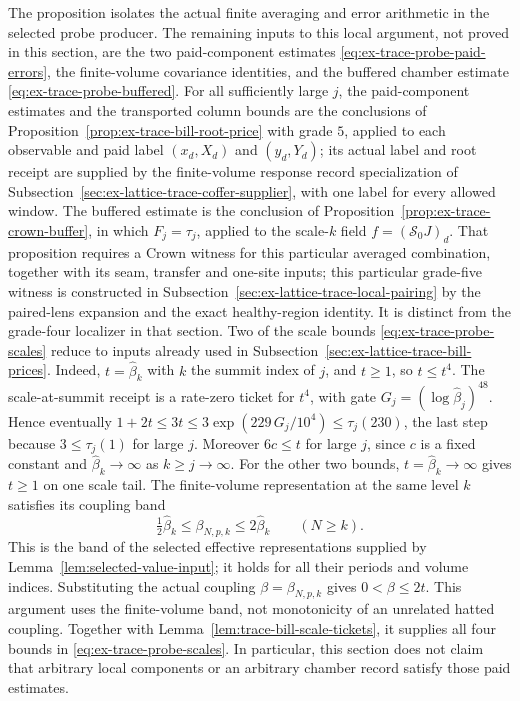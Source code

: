The proposition isolates the actual finite averaging and error arithmetic
in the selected probe producer. The remaining inputs to this
local argument, not proved in this section, are the two paid-component estimates
\eqref{eq:ex-trace-probe-paid-errors}, the finite-volume covariance
identities, and the buffered chamber estimate
\eqref{eq:ex-trace-probe-buffered}. For all sufficiently large $j$, the
paid-component estimates and the transported column bounds are the
conclusions of Proposition~\ref{prop:ex-trace-bill-root-price} with
grade $5$, applied to each observable and paid label $(x_d,X_d)$ and
$(y_d,Y_d)$; its actual label and root receipt are supplied by the finite-volume response record
specialization of Subsection~\ref{sec:ex-lattice-trace-coffer-supplier},
with one label for every allowed window. The buffered estimate is the conclusion of
Proposition~\ref{prop:ex-trace-crown-buffer}, in which $F_j=\tau_j$,
applied to the scale-$k$ field $f=(\mathscr S_0J)_d$. That proposition
requires a Crown witness for this particular averaged combination,
together with its seam, transfer and one-site inputs; this particular grade-five witness is constructed in
Subsection~\ref{sec:ex-lattice-trace-local-pairing} by the paired-lens
expansion and the exact healthy-region identity. It is distinct from
the grade-four localizer in that section. Two of the scale bounds \eqref{eq:ex-trace-probe-scales} reduce
to inputs already used in Subsection~\ref{sec:ex-lattice-trace-bill-prices}.
Indeed, $t=\widehat\beta_k$ with $k$ the summit index of $j$, and $t\ge1$,
so $t\le t^4$. The scale-at-summit receipt is a rate-zero ticket for
$t^4$, with gate $G_j=(\log\widehat\beta_j)^{48}$. Hence eventually
$1+2t\le3t\le3\exp(229\,G_j/10^4)\le\tau_j(230)$, the last step because
$3\le\tau_j(1)$ for large $j$. Moreover $6c\le t$ for large $j$, since $c$
is a fixed constant and $\widehat\beta_k\to\infty$ as $k\ge j\to\infty$.
For the other two bounds, $t=\widehat\beta_k\to\infty$ gives
$t\ge1$ on one scale tail. The finite-volume representation at the
same level $k$ satisfies its coupling band
\[
 \tfrac12\widehat\beta_k\le\beta_{N,p,k}\le2\widehat\beta_k
 \qquad(N\ge k).
\]
This is the band of the selected effective representations supplied by
Lemma~\ref{lem:selected-value-input}; it holds for
all their periods and volume indices. Substituting the actual coupling
$\beta=\beta_{N,p,k}$ gives $0<\beta\le2t$. This argument uses the
finite-volume band, not monotonicity of an unrelated hatted coupling.
Together with Lemma~\ref{lem:trace-bill-scale-tickets}, it supplies
all four bounds in \eqref{eq:ex-trace-probe-scales}.
In
particular, this section does not claim that arbitrary local components
or an arbitrary chamber record satisfy those paid estimates.
